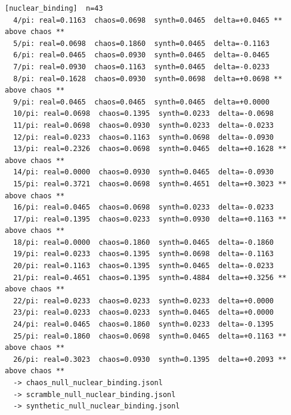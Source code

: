 \documentclass[11pt, letterpaper, openany]{book}
\begin{document}
\begin{empiricalbox}
\begin{lstlisting}[style=terminal]
[nuclear_binding]  n=43
  4/pi: real=0.1163  chaos=0.0698  synth=0.0465  delta=+0.0465 ** above chaos **
  5/pi: real=0.0698  chaos=0.1860  synth=0.0465  delta=-0.1163
  6/pi: real=0.0465  chaos=0.0930  synth=0.0465  delta=-0.0465
  7/pi: real=0.0930  chaos=0.1163  synth=0.0465  delta=-0.0233
  8/pi: real=0.1628  chaos=0.0930  synth=0.0698  delta=+0.0698 ** above chaos **
  9/pi: real=0.0465  chaos=0.0465  synth=0.0465  delta=+0.0000
  10/pi: real=0.0698  chaos=0.1395  synth=0.0233  delta=-0.0698
  11/pi: real=0.0698  chaos=0.0930  synth=0.0233  delta=-0.0233
  12/pi: real=0.0233  chaos=0.1163  synth=0.0698  delta=-0.0930
  13/pi: real=0.2326  chaos=0.0698  synth=0.0465  delta=+0.1628 ** above chaos **
  14/pi: real=0.0000  chaos=0.0930  synth=0.0465  delta=-0.0930
  15/pi: real=0.3721  chaos=0.0698  synth=0.4651  delta=+0.3023 ** above chaos **
  16/pi: real=0.0465  chaos=0.0698  synth=0.0233  delta=-0.0233
  17/pi: real=0.1395  chaos=0.0233  synth=0.0930  delta=+0.1163 ** above chaos **
  18/pi: real=0.0000  chaos=0.1860  synth=0.0465  delta=-0.1860
  19/pi: real=0.0233  chaos=0.1395  synth=0.0698  delta=-0.1163
  20/pi: real=0.1163  chaos=0.1395  synth=0.0465  delta=-0.0233
  21/pi: real=0.4651  chaos=0.1395  synth=0.4884  delta=+0.3256 ** above chaos **
  22/pi: real=0.0233  chaos=0.0233  synth=0.0233  delta=+0.0000
  23/pi: real=0.0233  chaos=0.0233  synth=0.0465  delta=+0.0000
  24/pi: real=0.0465  chaos=0.1860  synth=0.0233  delta=-0.1395
  25/pi: real=0.1860  chaos=0.0698  synth=0.0465  delta=+0.1163 ** above chaos **
  26/pi: real=0.3023  chaos=0.0930  synth=0.1395  delta=+0.2093 ** above chaos **
  -> chaos_null_nuclear_binding.jsonl
  -> scramble_null_nuclear_binding.jsonl
  -> synthetic_null_nuclear_binding.jsonl


\end{lstlisting}
\end{empiricalbox}
\end{document}
